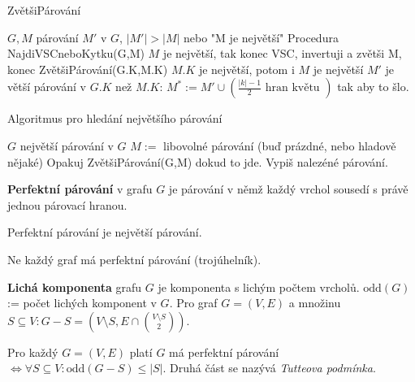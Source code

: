 \begin{algorithm}[!h]
	\caption{ZvětšiPárování}
	\begin{algorithmic}[1]
		\Require $G,M$
		\Ensure párování $M'$ v $G$, $|M'| > |M|$ nebo "M je největší"
		\State Procedura NajdiVSCneboKytku(G,M)
		\State $M$ je největší, tak konec
		\State VSC, invertuji a zvětši M, konec
			\State ZvětšiPárování(G.K,M.K)
			\State $M.K$ je největší, potom i $M$ je největší
			\State $M'$ je větší párování v $G.K$ než $M.K$: $M^\ast := M' \cup (\frac{|k|-1}{2} \text{ hran květu })$ tak aby to šlo.
		\EndIf
	\end{algorithmic}
\end{algorithm}

\begin{algorithm}[!h]
	\caption{Algoritmus pro hledání největšího párování}
	\begin{algorithmic}[1]
		\Require $G$
		\Ensure největší párování v $G$
		\State $M:=$ libovolné párování (buď prázdné, nebo hladově nějaké)
		\State Opakuj ZvětšiPárování(G,M) dokud to jde.
		\Return Vypiš nalezéné párování.
	\end{algorithmic}
\end{algorithm}

\begin{definice}
	\textbf{Perfektní párování} v grafu $G$ je párování v němž každý vrchol sousedí s právě jednou párovací hranou.
\end{definice}

\begin{pozor}
	Perfektní párování je největší párování.
\end{pozor}

\begin{pozor}
	Ne každý graf má perfektní párování (trojúhelník).
\end{pozor}

\begin{definice}
	\textbf{Lichá komponenta} grafu $G$ je komponenta s lichým počtem vrcholů. \textbf{$\text{odd}(G)$} := počet lichých komponent v $G$. Pro graf $G= (V,E)$ a množinu $S \subseteq V : G-S = (V \setminus S, E \cap \binom{V \setminus S}{2})$.
\end{definice}

\begin{veta}[Tutte]
	Pro každý $G=(V,E)$ platí $G$ má perfektní párování $\Leftrightarrow \forall S \subseteq V: \text{odd}(G-S) \leq |S|$. Druhá část se nazývá \textit{Tutteova podmínka}.
\end{veta}

